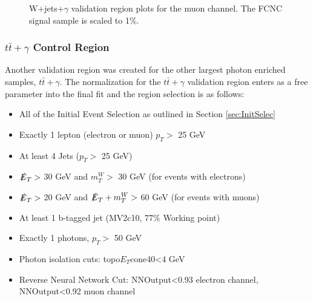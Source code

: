 \begin{figure}[h!]
\hfil  %
\caption{W+jets+$\gamma$ validation region plots for the muon channel.  The FCNC signal sample is scaled to 1\%.}
\label{fig:VR1muj}
\end{figure}

\subsubsection{$t\bar{t}+\gamma$ Control Region}
Another validation region was created for the other largest photon enriched samples, $t\bar{t}+\gamma$. The normalization for the $t\bar{t}+\gamma$ validation region enters as a free parameter into the final fit and the region selection is as follows:
\begin{itemize}
\item All of the Initial Event Selection as outlined in Section \ref{sec:InitSelec}
\item Exactly 1 lepton (electron or muon) $p_T >$ 25 GeV
\item At least 4 Jets  ($p_T >$ 25 GeV) 
\item $\slashed{E}_T >$ 30 GeV and $m_T^W >$ 30 GeV (for events with electrons)
\item $\slashed{E}_T >$ 20 GeV and $\slashed{E}_T + m_T^W >$ 60 GeV (for events with muons)
\item At least 1 b-tagged jet (MV2c10, 77\% Working point)
\item Exactly 1 photons, $p_T >$ 50 GeV
\item Photon isolation cuts: topo$E_T$cone40<4 GeV
\item Reverse Neural Network Cut: NNOutput<0.93 electron channel, NNOutput<0.92 muon channel
\end{itemize}

